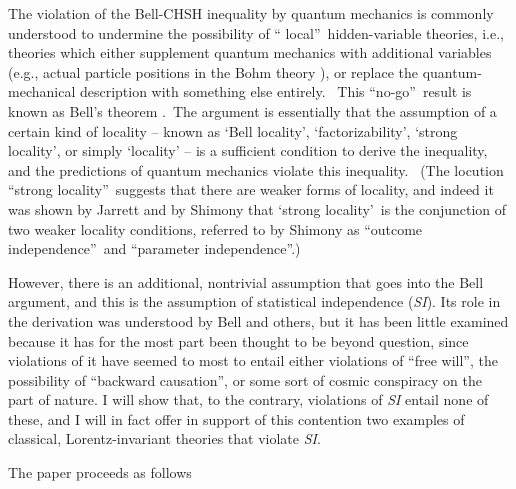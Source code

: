\documentclass[12pt]{article}%
\begin{document}
The violation of the Bell-CHSH inequality by quantum mechanics is commonly
understood to undermine the possibility of \textquotedblleft
local\textquotedblright\ hidden-variable theories, i.e., theories which either
supplement quantum mechanics with additional variables (e.g., actual particle
positions in the Bohm theory \cite{Boh52a}\cite{Boh52b}), or replace the
quantum-mechanical description with something else entirely. \ This
\textquotedblleft no-go\textquotedblright\ result is known as Bell's theorem
\cite{Bell64}.\ The argument is essentially that the assumption of a certain
kind of locality -- known as `Bell locality', `factorizability'\cite{Fin80},
`strong locality'\cite{Jar84}, or simply `locality'\cite{Bell64} -- is a
sufficient condition to derive the inequality, and the predictions of quantum
mechanics violate this inequality. \ (The locution \textquotedblleft strong
locality\textquotedblright\ suggests that there are weaker forms of locality,
and indeed it was shown by Jarrett \cite{Jar84} \cite{Jar89} and by Shimony
\cite{Shim84} that `strong locality'\ is the conjunction of two weaker
locality conditions, referred to by Shimony as \textquotedblleft outcome
independence\textquotedblright\ and \textquotedblleft parameter
independence\textquotedblright.)

However, there is an additional, nontrivial assumption that goes into the Bell
argument, and this is the assumption of statistical independence (\emph{SI}).
Its role in the derivation was understood by Bell and others, but it has been
little examined because it has for the most part been thought to be beyond
question, since violations of it have seemed to most to entail either
violations of \textquotedblleft free will\textquotedblright, the possibility
of \textquotedblleft backward causation\textquotedblright, or some sort of
cosmic conspiracy on the part of nature. I will show that, to the contrary,
violations of \emph{SI} entail none of these, and I will in fact offer in
support of this contention two examples of classical, Lorentz-invariant
theories that violate \emph{SI}.

The paper proceeds as follows
\end{document}
